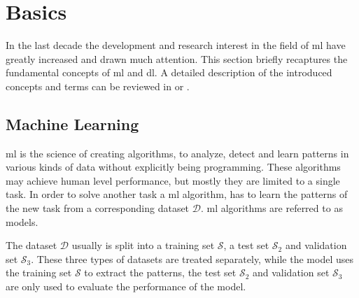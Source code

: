 
\section{Basics}\label{ord:ch2:sec1}

In the last decade the development and research interest in the field of \gls{ml} have greatly increased and drawn much attention. 
This section briefly recaptures the fundamental concepts of \gls{ml} and \gls{dl}.
A detailed description of the introduced concepts and terms can be reviewed in \cite{Ger17-HandsOn} or \cite{Goodfellow-et-al-2016}.


\subsection{Machine Learning}\label{ord:ch2:sec1:subsec1}

\gls{ml} is the science of creating algorithms, to analyze, detect and learn patterns in various kinds of data without explicitly being programming.
These algorithms may achieve human level performance, but mostly they are limited to a single task.
In order to solve another task a \gls{ml} algorithm, has to learn the patterns of the new task from a corresponding dataset $\mathcal{D}$.
\gls{ml} algorithms are referred to as models.

The dataset $\mathcal{D}$ usually is split into a training set $\mathcal{S}$, a test set $\mathcal{S}_2$ and validation set $\mathcal{S}_3$.
These three types of datasets are treated separately, while the model uses the training set $\mathcal{S}$ to extract the patterns, the test set $\mathcal{S}_2$ and validation set $\mathcal{S}_3$ are only used to evaluate the performance of the model.

